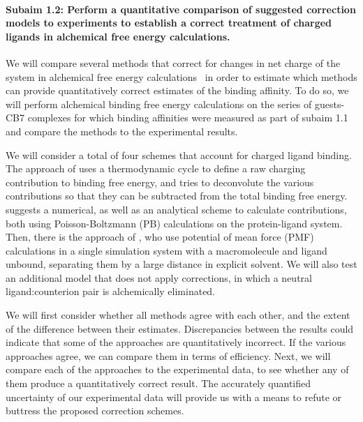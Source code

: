 \documentclass[10pt,final]{article}
\newcommand{\subsubsubsection}[1]{\paragraph*{#1}}
\begin{document}
\subsubsubsection{Subaim 1.2: Perform a quantitative comparison of suggested correction models to experiments to establish a correct treatment of charged ligands in alchemical free energy calculations.}
We will compare several methods that correct for changes in net charge of the system in alchemical free energy calculations~\cite{Reif2013a,Rocklin2013a, Lin2014a} in order to estimate which methods can provide quantitatively correct estimates of the binding affinity.
%
To do so, we will perform alchemical binding free energy calculations on the series of guests-CB7 complexes for which binding affinities were measured as part of subaim 1.1 and compare the methods to the experimental results.

We will consider a total of four schemes that account for charged ligand binding.
%
The approach of \textcite{Reif2013a} uses a thermodynamic cycle to define a raw charging contribution to binding free energy, and tries to deconvolute the various contributions so that they can be subtracted from the total binding free energy.
%
\textcite{Rocklin2013a} suggests a numerical, as well as an analytical scheme to calculate contributions, both using Poisson-Boltzmann (PB) calculations on the protein-ligand system.
%
Then, there is the approach of \textcite{Lin2014a}, who use potential of mean force (PMF) calculations in a single simulation system with a macromolecule and ligand unbound, separating them by a large distance in explicit solvent.
%
We will also test an additional model that does not apply corrections, in which a neutral ligand:counterion pair is alchemically eliminated. 


%
We will first consider whether all methods agree with each other, and the extent of the difference between their estimates.
%
Discrepancies between the results could indicate that some of the approaches are quantitatively incorrect.
%
If the various approaches agree, we can compare them in terms of efficiency.
%
Next, we will compare each of the approaches to the experimental data, to see whether any of them produce a quantitatively correct result.
%
The accurately quantified uncertainty of our experimental data will provide us with a means to refute or buttress the proposed correction schemes.
\end{document}
